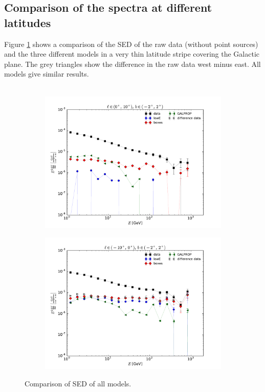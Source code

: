 \subsection{Comparison of the spectra at different latitudes}

Figure \ref{fig:SED_all} shows a comparison of the SED of the raw data (without point sources) and the three different models in a very thin latitude stripe covering the Galactic plane. The grey triangles show the difference in the raw data west minus east. All models give similar results. \\
\\
\begin{figure}[h!]
    \begin{subfigure}{0.5\textwidth}
        \includegraphics[width=\textwidth]{plots/SED_all_models_source_l=5_b=0.pdf}
    \end{subfigure} 
    \begin{subfigure}{0.5\textwidth}
        \includegraphics[width=\textwidth]{plots/SED_all_models_source_l=-5_b=0.pdf}
    \end{subfigure}
  	\caption{Comparison of SED of all models.}
  	\label{fig:SED_all}
\end{figure}

